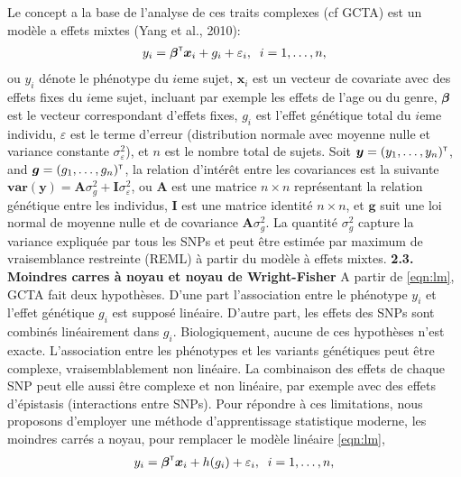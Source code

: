 \documentclass[12pt]{article}
\newcommand{\var}{\mathbf{var}}
\newcommand{\trans}{^{\mbox{\tiny {\sf T}}}}
\newcommand{\Abf}{{\bm A}}
\newcommand{\Ibf}{{\bm I}}
\newcommand{\gbf}{{\bm g}}
\newcommand{\xbf}{{\bm x}}
\newcommand{\ybf}{{\bm y}}
\newcommand{\greekbold}[1]{\mbox{\boldmath $#1$}}
\newcommand{\betabf}{\greekbold{\beta}}
\begin{document}
\noindent
Le concept a la base de l'analyse de ces traits complexes (cf GCTA) est un mod\`ele a effets mixtes (Yang et al., 2010):
\begin{eqnarray} \label{eqn:lm}
y_i = \betabf\trans \xbf_i + g_i + \varepsilon_i, \;\; i = 1, \ldots, n,
\end{eqnarray}
ou $y_i$ d\'enote le ph\'enotype du $i$eme sujet, $\xbf_i$ est un vecteur de covariate avec des effets fixes du $i$eme sujet, incluant par exemple les effets de l'age ou du genre, $\betabf$ est le vecteur correspondant d'effets fixes, $g_i$ est l'effet g\'en\'etique total du $i$eme individu, $\varepsilon$ est le terme d'erreur (distribution normale avec moyenne nulle et variance constante $\sigma^2_\varepsilon$), et $n$ est le nombre total de sujets. 
Soit $\ybf = (y_1, \ldots, y_n)\trans$, and $\gbf = (g_1, \ldots, g_n)\trans$, la relation d'int\'erêt entre les covariances est la suivante $\var(\ybf) = \Abf \sigma^2_g + \Ibf \sigma^2_\varepsilon$,
ou $\Abf$ est une matrice $n \times n$ repr\'esentant la relation g\'en\'etique entre les individus, $\Ibf$ est une matrice identit\'e $n \times n$, et $\gbf$ suit une loi normal de moyenne nulle et de covariance $\Abf \sigma^2_g$. La quantit\'e  $\sigma^2_g$ capture la  variance expliqu\'ee par tous les SNPs et peut être estim\'ee par maximum de vraisemblance restreinte (REML) \`a partir du mod\`ele \`a effets mixtes.
\smallskip
\noindent
\textbf{2.3. Moindres carres \`a noyau et noyau de Wright-Fisher}
\smallskip
\noindent
A partir de \eqref{eqn:lm}, GCTA fait deux hypoth\`eses. D'une part l'association entre le ph\'enotype $y_i$ et l'effet g\'en\'etique $g_i$ est suppos\'e lin\'eaire. D'autre part, les effets des SNPs sont combin\'es lin\'eairement dans $g_i$. Biologiquement, aucune de ces hypoth\`eses n'est exacte. L'association entre les ph\'enotypes et les variants g\'en\'etiques peut être complexe, vraisemblablement non lin\'eaire. La combinaison des effets de chaque SNP peut elle aussi être complexe et non lin\'eaire, par exemple avec des effets d'\'epistasis (interactions entre SNPs). 
Pour r\'epondre \`a ces limitations, nous proposons d'employer une m\'ethode d'apprentissage statistique moderne, les moindres carr\'es a noyau, pour remplacer le mod\`ele lin\'eaire \eqref{eqn:lm},
\begin{eqnarray} \label{eqn:nm}
y_i = \betabf\trans \xbf_i + h(g_i) + \varepsilon_i, \;\; i = 1, \ldots, n,
\end{eqnarray}
\end{document}
